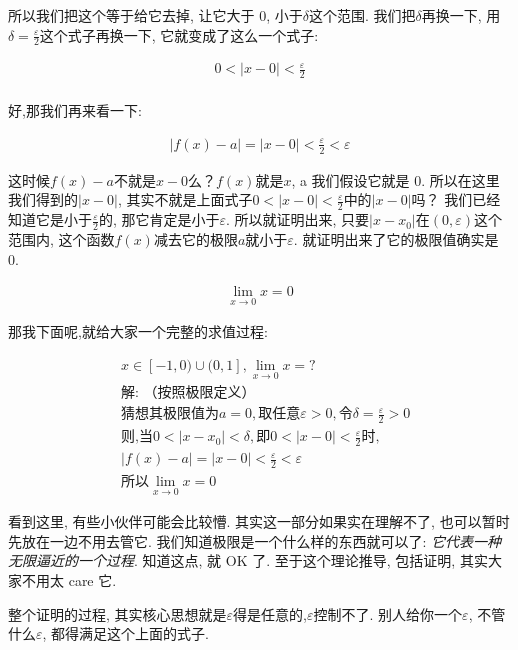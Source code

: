 所以我们把这个等于给它去掉, 让它大于 0, 小于$\delta$这个范围. 我们把$\delta$再换一下, 用$\delta = \frac{\varepsilon}{2}$这个式子再换一下, 它就变成了这么一个式子: 

\begin{align*}
  0 < |x - 0| < \frac{\varepsilon}{2} \\
\end{align*}

好,那我们再来看一下: 

\begin{align*}
  |f(x)-a| = |x - 0| < \frac{\varepsilon}{2} < \varepsilon
\end{align*}


这时候$f(x)-a$不就是$x-0$么？$f(x)$就是$x$, a 我们假设它就是 0. 所以在这里我们得到的$|x-0|$, 其实不就是上面式子$0<|x-0|<\frac{\varepsilon}{2}$中的$|x-0|$吗？ 我们已经知道它是小于$\frac{\varepsilon}{2}$的, 那它肯定是小于$\varepsilon$. 所以就证明出来, 只要$|x-x_0|$在$(0, \varepsilon)$这个范围内, 这个函数$f(x)$减去它的极限$a$就小于$\varepsilon$. 就证明出来了它的极限值确实是 0. 

\begin{align*}
  \lim_{x \to 0} x = 0
\end{align*}

那我下面呢,就给大家一个完整的求值过程: 

\begin{align*}
  & x \in [-1,0) \cup (0, 1], \lim_{x \to 0} x = ? \\
  & \mbox{解:  （按照极限定义）}\\
  & \mbox{猜想其极限值为}a = 0, \mbox{取任意}\varepsilon > 0, \mbox{令} \delta = \frac{\varepsilon}{2} > 0 \\
  & \mbox{则,当} 0 < |x-x_0| < \delta, \mbox{即} 0<|x-0| < \frac{\varepsilon}{2} \mbox{时},\\
  & |f(x) - a| = |x - 0| < \frac{\varepsilon}{2} < \varepsilon \\
  & \mbox{所以} \lim_{x \to 0} x = 0
\end{align*}

看到这里, 有些小伙伴可能会比较懵. 其实这一部分如果实在理解不了, 也可以暂时先放在一边不用去管它. 我们知道极限是一个什么样的东西就可以了: \textit{它代表一种无限逼近的一个过程}. 知道这点, 就 OK 了. 至于这个理论推导, 包括证明, 其实大家不用太 care 它. 

整个证明的过程, 其实核心思想就是$\varepsilon$得是任意的,$\varepsilon$控制不了.  别人给你一个$\varepsilon$, 不管什么$\varepsilon$, 都得满足这个上面的式子. 

